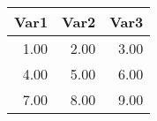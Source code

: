\begin{tabular}{ r r r }
	Var1 & Var2 & Var3 \\
	\hline
	1.00 & 2.00 & 3.00 \\
	4.00 & 5.00 & 6.00 \\
	7.00 & 8.00 & 9.00 \\
\end{tabular}